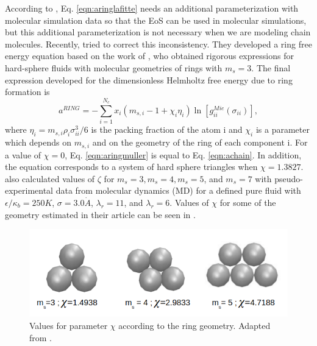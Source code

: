 According to , Eq. \eqref{eqn:aringlafitte} needs an additional parameterization with molecular simulation data so that the EoS can  be used in molecular simulations, but this additional parameterization is not necessary when we are modeling chain molecules. Recently,  tried to correct this inconsistency. They developed a ring free energy equation based on the work of , who obtained rigorous expressions for hard-sphere fluids with molecular geometries of rings with $m_s=3$. The final expression developed for the dimensionless Helmholtz free energy due to ring formation is
\begin{equation}
a^{RING} =-\sum_{i=1}^{N_{c}} x_{i}\left (m_{s,i}-1+\chi_{i}\eta_{i} \right )\ln \left [g_{ii}^{Mie}(\sigma_{ii}) \right] ,
\label{eqn:aringmuller}
\end{equation}
where $\eta_{i}=m_{s,i}\rho_{i}\sigma_{ii}^{3}/6$ is the packing fraction of the atom i and $\chi_{i}$ is a parameter which depends on $m_{s,i}$ and on the geometry of the ring of each component i. For a value of $\chi=0$, Eq. \eqref{eqn:aringmuller} is equal to Eq. \eqref{eqn:achain}. In addition, the equation corresponds to a system of hard sphere triangles when $\chi=1.3827$.  also calculated values of $\zeta$ for $m_{s}=3,m_{s}=4,m_{s}=5$, and $m_{s}=7$ with pseudo-experimental data from molecular dynamics (MD) for a defined pure fluid with $\epsilon/\kappa_{b} = 250 K$, $\sigma = 3.0 \dot{A}$, $\lambda_{r} = 11$, and $\lambda_{r} = 6$. Values of $\chi$  for some of the geometry estimated in their article can be seen in .
\begin{figure}[th]
	\centering
	\includegraphics[scale=0.5]{Figures/mullergeo.png}
	\caption{Values for parameter $\chi$ according to the ring geometry. Adapted from .}
	\label{ringqsi}
\end{figure}

